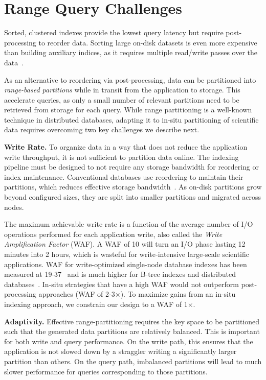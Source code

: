 
\section{Range Query Challenges}
\label{sec:carp:distrib}

Sorted, clustered indexes provide the lowest query latency but require post-processing to reorder
data.
Sorting large on-disk datasets is even more expensive than building auxiliary indices, as it
requires multiple read/write passes over the data~\cite{Rasmu2011:TritonSort}.

As an alternative to reordering via post-processing, data can be partitioned into \emph{range-based
  partitions} while in transit from the application to storage.
This accelerate queries, as only a small number of relevant partitions need to be retrieved from
storage for each query.
While range partitioning is a well-known technique in distributed databases, adapting it to in-situ
partitioning of scientific data requires overcoming two key challenges we describe next.

\textbf{Write Rate.
}
To organize data in a way that does not reduce the application write throughput,
it is not sufficient to partition data online.
The indexing pipeline must be designed to not require any storage bandwidth for reordering or index
maintenance.
Conventional databases use reordering to maintain their partitions, which reduces effective storage
bandwidth~\cite{Ganes2004:OnlineRangePartitioning,Konst2011:FastCostEffectiveOnline}.
As on-disk partitions grow beyond configured sizes, they are split into smaller partitions and
migrated across nodes.

The maximum achievable write rate is a function of the average number of I/O operations performed
for each application write, also called the \emph{Write Amplification Factor} (WAF).
A WAF of 10 will turn an I/O phase lasting 12 minutes into 2 hours, which is wasteful for
write-intensive large-scale scientific applications.
WAF for write-optimized single-node database indexes has been measured at
19-37~\cite{Raju2017:PebblesDB} and is much higher for B-tree indexes and distributed
databases~\cite{Qiao2022:ClosingTreeVs}.
In-situ strategies that have a high WAF would not outperform post-processing approaches (WAF of
2-3$\times$).
To maximize gains from an in-situ indexing approach, we constrain our design to a WAF of 1$\times$.

\textbf{Adaptivity.
}
Effective range-partitioning requires the key space to be partitioned such that the generated data
partitions are relatively balanced.
This is important for both write and query performance.
On the write path, this ensures that the application is not slowed down by a straggler writing a
significantly larger partition than others.
On the query path, imbalanced partitions will lead to much slower performance for queries
corresponding to those partitions.

